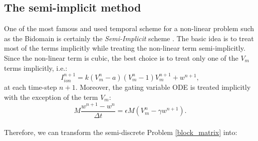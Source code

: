 \documentclass[a4paper,11pt]{article}
\begin{document}
\subsection{The semi-implicit method}
One of the most famous and used temporal scheme for a non-linear problem such as the Bidomain is certainly the \emph{Semi-Implicit} scheme \cite{acta}. The basic idea is to treat most of the terms implicitly while treating the non-linear term semi-implicitly. Since the non-linear term is cubic, the best choice is to treat only one of the $V_m$ terms implicitly, i.e.:
\begin{equation*}
I_{ion}^{n+1}=k(V_m^n-a)(V_m^n-1)V_m^{n+1}+w^{n+1},
\end{equation*}
at each time-step $n+1$. 
Moreover, the gating variable ODE is treated implicitly with the exception of the term $V_m$:
\begin{equation*}
M \frac{w^{n+1}-w^n}{\Delta t}=\epsilon M (V_m^n-\gamma w^{n+1}).
\end{equation*}
\vspace{5mm} \\
Therefore, we can transform the semi-discrete Problem \ref{block_matrix} into:
\end{document}
